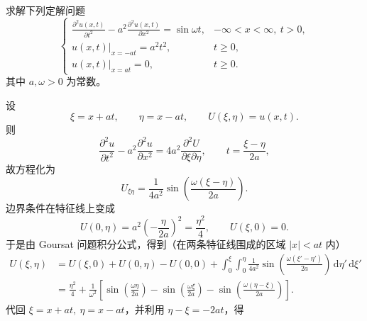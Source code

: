 ﻿


\begin{question}[第1题（20分）]

求解下列定解问题
\[
\begin{cases}
\displaystyle \frac{\partial^2 u(x,t)}{\partial t^2} - a^2 \frac{\partial^2 u(x,t)}{\partial x^2} = \sin\omega t, & -\infty < x < \infty,\ t>0,\\[6pt]
\displaystyle u(x,t)\big|_{x=-at} = a^2 t^2, & t\geq 0,\\[6pt]
\displaystyle u(x,t)\big|_{x=at} = 0, & t\geq 0.
\end{cases}
\]
其中 $a,\omega>0$ 为常数。

\begin{solution}

设
\[
\xi=x+at,\qquad \eta=x-at,\qquad U(\xi,\eta)=u(x,t).
\]
则
\[
\frac{\partial^2 u}{\partial t^2}-a^2\frac{\partial^2 u}{\partial x^2}=4a^2\frac{\partial^2 U}{\partial \xi\partial \eta},
\qquad t=\frac{\xi-\eta}{2a},
\]
故方程化为
\[
U_{\xi\eta}=\frac{1}{4a^2}\sin\!\left(\frac{\omega(\xi-\eta)}{2a}\right).
\]
边界条件在特征线上变成
\[
U(0,\eta)=a^2\!\left(-\frac{\eta}{2a}\right)^2=\frac{\eta^2}{4},
\qquad
U(\xi,0)=0.
\]
于是由 Goursat 问题积分公式，得到（在两条特征线围成的区域 $|x|<at$ 内）
\[
\begin{aligned}
U(\xi,\eta)
&=U(\xi,0)+U(0,\eta)-U(0,0)
+\int_0^{\xi}\int_0^{\eta}
\frac{1}{4a^2}\sin\!\left(\frac{\omega(\xi'-\eta')}{2a}\right)
\,\mathrm d\eta'\,\mathrm d\xi'\\
&=\frac{\eta^2}{4}+\frac{1}{\omega^2}\left[
\sin\!\left(\frac{\omega\eta}{2a}\right)
-\sin\!\left(\frac{\omega\xi}{2a}\right)
-\sin\!\left(\frac{\omega(\eta-\xi)}{2a}\right)
\right].
\end{aligned}
\]
代回 $\xi=x+at,\ \eta=x-at$，并利用 $\eta-\xi=-2at$，得

\end{solution}
\end{question}


